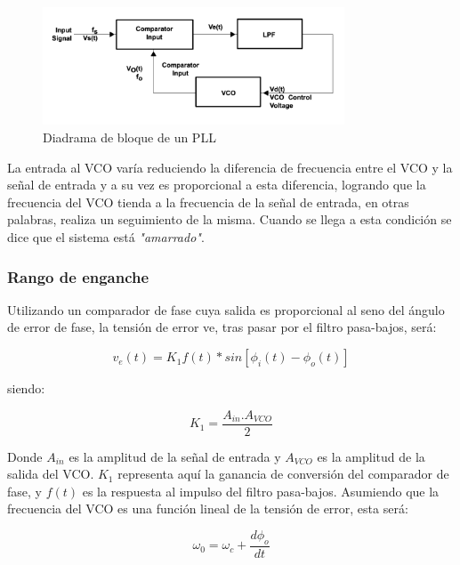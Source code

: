 \begin{figure}[H]
	\centering
	\includegraphics[width=0.8\textwidth]{../1. PLL/Imagenes/Diagrama bloque PLL.png}
	\caption{Diadrama de bloque de un PLL}
	\label{fig:DiagramaBloquePLL}
\end{figure}

La entrada al VCO varía reduciendo la diferencia de frecuencia entre el VCO y la señal de entrada y a su vez es proporcional a esta diferencia, logrando que la frecuencia del VCO tienda a la frecuencia de la señal de entrada, en otras palabras, realiza un seguimiento de la misma. Cuando se llega a esta condición se dice que el sistema está \textit{"amarrado"}.

\subsubsection{Rango de enganche}

Utilizando un comparador de fase cuya salida es proporcional al seno del ángulo de error de fase, la tensión de error ve, tras pasar por el filtro pasa-bajos, será:

\begin{equation}
	v_e(t) = K_1 f(t)*sin[\phi_i(t)-\phi_o(t)]
	\label{EqVe}
\end{equation}

siendo: 

\begin{equation}
	K_1 = \frac{A_{in}.A_{VCO}}{2}
\end{equation}

Donde $A_{in}$ es la amplitud de la señal de entrada y $A_{VCO}$ es la amplitud de la salida del VCO. $K_1$ representa aquí la ganancia de conversión del comparador de fase, y $f(t)$ es la respuesta al impulso del filtro pasa-bajos. Asumiendo que la frecuencia del VCO es una función lineal de la tensión de error, esta será:

\begin{equation}
	\omega_0 = \omega_c + \frac{d\phi_o}{dt}
\end{equation}

